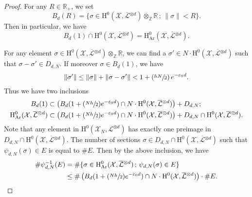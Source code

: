 \documentclass[JEP,XML,SOM,Unicode,published]{cedram}
\newcommand{\Psfrac}[2]{(\sfrac{#1}{#2})}
\newcommand{\sep}{\,;\,}
\theoremstyle{plain}
\theoremstyle{definition}
\newcommand{\ho}{\mathrm{H}}
\newcommand{\X}{\mathcal{X}}
\newcommand{\Li}{\overline{\mathcal{L}}{}}
\newcommand{\li}{\mathcal{L}}
\newcommand{\Z}{\mathbb{Z}}
\newcommand{\R}{\mathbb{R}}
\begin{document}
\begin{proof}[Proof]
For any $R\in \R_+$, we set
\[
B_d(R)=\{ \sigma\in \ho^0(\X,\Li^{\otimes d})\otimes_{\mathbb{Z}}\mathbb{R}\sep \lVert\sigma\rVert<R\}.
\]
Then in particular, we have
\[
B_d(1)\cap \ho^0(\X,\Li^{\otimes d})=\ho^0_{\mathrm{Ar}}(\X,\Li^{\otimes d}).
\]

For any element $\sigma\in \ho^0(\X,\Li^{\otimes d})\otimes_{\Z}\R$, we can find a $\sigma'\in N\cdot\ho^0(\X,\Li^{\otimes d})$ such that $\sigma-\sigma'\in D_{d, N}$. If moreover $\sigma \in B_d(1)$, we have
\[
\lVert \sigma' \rVert \leq \lVert \sigma\rVert + \lVert \sigma-\sigma' \rVert <1+\Psfrac{hN}{2}\,e^{-\varepsilon_0 d}.
\]
Thus we have two inclusions
\begin{align*}
B_d(1)&\subset \left(B_d(1+\Psfrac{Nh}{2}e^{-\varepsilon_0 d}) \cap N\cdot \ho^0(\X,\Li^{\otimes d}) \right)+D_{d,N};\\
\ho^0_{\mathrm{Ar}}(\X,\Li^{\otimes d})&\subset \left(B_d(1+\Psfrac{Nh}{2}e^{-\varepsilon_0 d}) \cap N\cdot \ho^0(\X,\Li^{\otimes d}) \right)+D_{d,N}\cap \ho^0(\X,\Li^{\otimes d}).
\end{align*}
Note that any element in $\ho^0(\X_N,\li^{\otimes d}) $ has exactly one preimage in $D_{d,N}\cap \ho^0(\X,\Li^{\otimes d}) $. The number of sections $\sigma\in D_{d,N}\cap \ho^0(\X,\Li^{\otimes d})$ such that $\psi_{d,N}(\sigma) \in E$ is equal to $\#E$. Then by the above inclusion, we have
\begin{align*}
\#\psi_{d,N}^{-1}(E)&=\#\{ \sigma\in \ho^0_{\mathrm{Ar}}(\X,\Li^{\otimes d})\sep \psi_{d,N}(\sigma)\in E \} \\
&\leq \#\left(B_d(1+\Psfrac{Nh}{2}e^{-\varepsilon_0 d}) \cap N\cdot \ho^0(\X,\Li^{\otimes d}) \right)\cdot \#E.
\end{align*}


\end{proof}
\end{document}
